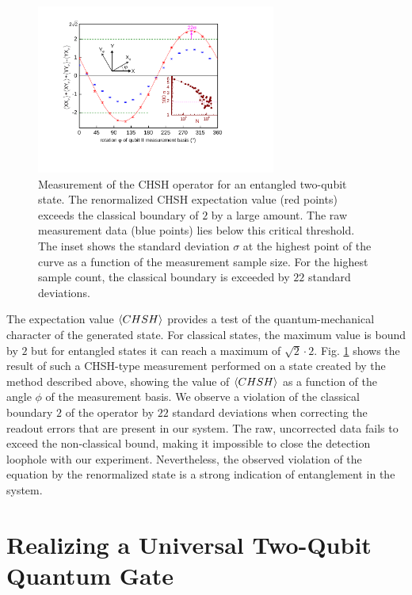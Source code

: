 \begin{figure}[ht!]
	\centering
		\includegraphics[width=0.7\textwidth]{./material/papers/iswap/submission1/Dewes_Figure3}
	\caption[Measurement of the CHSH operator of an entanged two-qubit state]{Measurement of the CHSH operator for an entangled two-qubit state. The renormalized CHSH expectation value (red points) exceeds the classical boundary of $2$ by a large amount. The raw measurement data (blue points) lies below this critical threshold. The inset shows the standard deviation $\sigma$ at the highest point of the curve as a function of the measurement sample size. For the highest sample count, the classical boundary is exceeded by $22$ standard deviations.}
	\label{fig:chsh_measurement}
\end{figure}

The expectation value $\left< CHSH \right>$ provides a test of the quantum-mechanical character of the generated state. For classical states, the maximum value is bound by $2$ but for entangled states it can reach a maximum of $\sqrt{2}\cdot 2$. Fig. \ref{fig:chsh_measurement} shows the result of such a CHSH-type measurement performed on a state created by the method described above, showing the value of $\left< CHSH \right>$ as a function of the angle $\phi$ of the measurement basis. We observe a violation of the classical boundary $2$ of the operator by $22$ standard deviations when correcting the readout errors that are present in our system. The raw, uncorrected data fails to exceed the non-classical bound, making it impossible to close the detection loophole with our experiment. Nevertheless, the observed violation of the equation by the renormalized state is a strong indication of entanglement in the system.

\section{Realizing a Universal Two-Qubit Quantum Gate}

